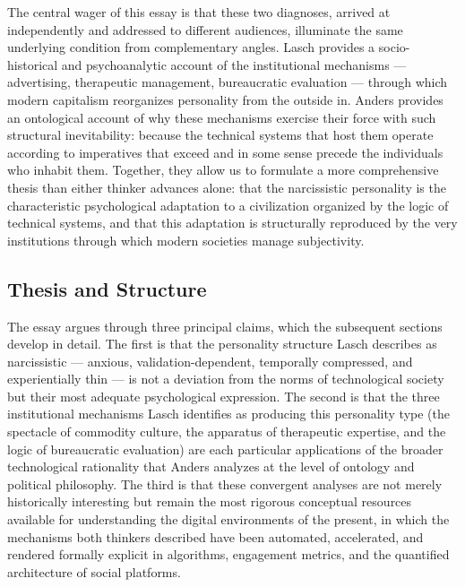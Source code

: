 \documentclass[12pt]{memoir}
\begin{document}
The central wager of this essay is that these two diagnoses, arrived at independently and
addressed to different audiences, illuminate the same underlying condition from complementary
angles. Lasch provides a socio-historical and psychoanalytic account of the institutional
mechanisms — advertising, therapeutic management, bureaucratic evaluation — through which modern
capitalism reorganizes personality from the outside in. Anders provides an ontological account
of why these mechanisms exercise their force with such structural inevitability: because the
technical systems that host them operate according to imperatives that exceed and in some sense
precede the individuals who inhabit them. Together, they allow us to formulate a more
comprehensive thesis than either thinker advances alone: that the narcissistic personality is
the characteristic psychological adaptation to a civilization organized by the logic of
technical systems, and that this adaptation is structurally reproduced by the very institutions
through which modern societies manage subjectivity.

\subsection{Thesis and Structure}

The essay argues through three principal claims, which the subsequent sections develop in
detail. The first is that the personality structure Lasch describes as narcissistic — anxious,
validation-dependent, temporally compressed, and experientially thin — is not a deviation from
the norms of technological society but their most adequate psychological expression. The second
is that the three institutional mechanisms Lasch identifies as producing this personality type
(the spectacle of commodity culture, the apparatus of therapeutic expertise, and the logic of
bureaucratic evaluation) are each particular applications of the broader technological
rationality that Anders analyzes at the level of ontology and political philosophy. The third is
that these convergent analyses are not merely historically interesting but remain the most
rigorous conceptual resources available for understanding the digital environments of the
present, in which the mechanisms both thinkers described have been automated, accelerated, and
rendered formally explicit in algorithms, engagement metrics, and the quantified architecture of
social platforms.
\end{document}
